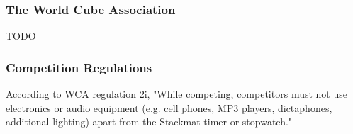 \subsubsection{The World Cube Association}
\label{subsec:world-cube-association}
TODO

\subsubsection{Competition Regulations}
\label{subsec:competition-regulations}

According to WCA regulation 2i, "While competing, competitors must not
use electronics or audio equipment (e.g. cell phones, MP3 players,
dictaphones, additional lighting) apart from the Stackmat timer or
stopwatch." \cite{wca-regulations}
